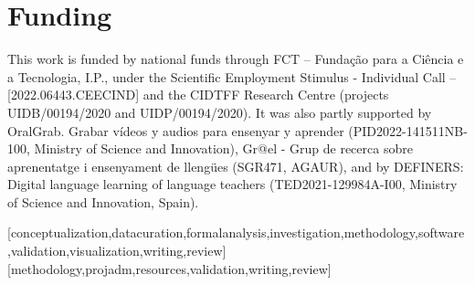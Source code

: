 \documentclass[english]{textolivre}
\begin{document}
\begin{polyabstract}
\begin{portuguese}
\begin{abstract}
\end{abstract}
\end{portuguese}
\end{polyabstract}

%
%
%
%
\section{Funding}\label{sec-funding}
This work is funded by national funds through FCT – Fundação para a Ciência e a Tecnologia, I.P., under the Scientific Employment Stimulus - Individual Call – [2022.06443.CEECIND] and the CIDTFF Research Centre (projects UIDB/00194/2020 and UIDP/00194/2020). It was also partly supported by OralGrab. Grabar vídeos y audios para ensenyar y aprender (PID2022-141511NB-100, Ministry of Science and Innovation), Gr@el - Grup de recerca sobre aprenentatge i ensenyament de llengües (SGR471, AGAUR), and by DEFINERS: Digital language learning of language teachers (TED2021-129984A-I00, Ministry of Science and Innovation, Spain).


\printbibliography
\label{sec-bib}
\begin{contributors}
[conceptualization,datacuration,formalanalysis,investigation,methodology,software,validation,visualization,writing,review]
[methodology,projadm,resources,validation,writing,review]
\end{contributors}

\newpage

\end{document}
